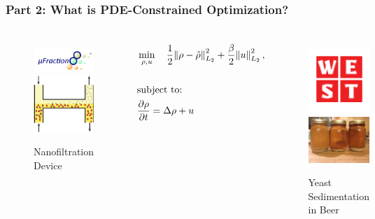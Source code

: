 \documentclass[aspectratio=169,xcolor=dvipsnames]{beamer}
\begin{document}
\begin{frame}
	\frametitle{Part 2: What is PDE-Constrained Optimization? }
	\begin{columns}
		\begin{figure}
			\includegraphics[width=4cm]{ufraction8.png}
			\includegraphics[width=4cm]{Microfilter.png}
			\caption{Nanofiltration Device}
		\end{figure}
		\begin{align*}
		&\min_{\rho,u} \quad \frac{1}{2}\norm{\rho- \hat{\rho}}_{L_2}^2 + \frac{\beta}{2} \norm{u}_{L_2}^2,\\
		\\
		&\text{subject to:}
		\\
		& \frac{\partial \rho}{\partial t}= \Delta \rho + u 
		\end{align*}
		\begin{figure}
		 \includegraphics[width=3cm]{west.png}\\
		 \includegraphics[width=3cm]{beer.jpg}
		 \caption{Yeast Sedimentation in Beer}
		\end{figure}
	
	\end{columns}
\end{frame}
\end{document}
